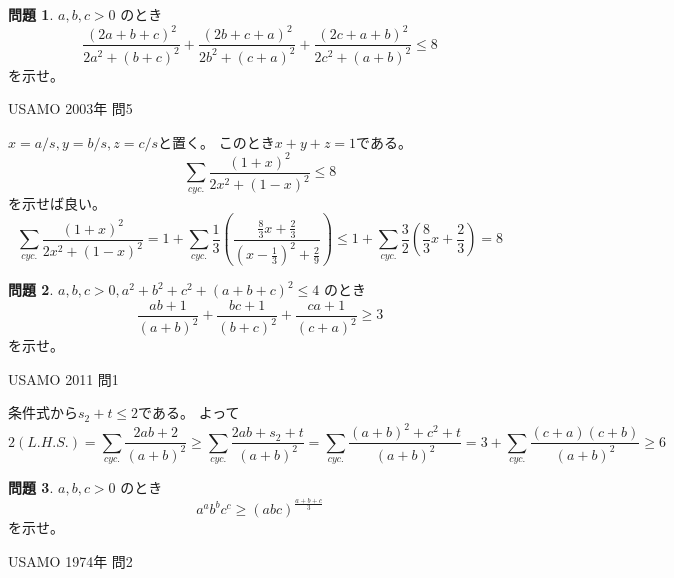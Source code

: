 \documentclass[uplatex, a5paper]{jsarticle}
\makeatletter
\theoremstyle{definition}
\newtheorem{prob}{問題}
\renewenvironment{proof}[1][\proofname]{
  \pushQED{\qed}%
  \normalfont \topsep6\p@\@plus6\p@\relax
  \trivlist
  \item[\hskip\labelsep
    #1\@addpunct{\textbf{.}}]\ignorespaces
}{%
  \popQED\endtrivlist\@endpefalse
}
\providecommand{\proofname}{証明}
\newcommand{\lhs }{ L.H.S. }
\def\qed{\hfill $\Box$}
\makeatother
\begin{document}
\newpage

\begin{prob}
  \(a,b,c>0\)
  のとき
  \[
  \frac{(2a+b+c)^2}{2a^2+(b+c)^2} + \frac{(2b+c+a)^2}{2b^2+(c+a)^2} + \frac{(2c+a+b)^2}{2c^2+(a+b)^2} \leq 8
  \]
  を示せ。
  \begin{flushright}
    USAMO 2003年 問5
  \end{flushright}
\end{prob}


\begin{proof}
  \(x=a/s , y=b/s , z=c/s\)と置く。
  このとき\(x+y+z=1\)である。
  \[
  \sum_{cyc.}\frac{(1+x)^2}{2x^2 + (1-x)^2} \leq 8
  \]
  を示せば良い。
  \[
  \sum_{cyc.}\frac{(1+x)^2}{2x^2 + (1-x)^2}
  = 1 + \sum_{cyc.}\frac{1}{3}
  \left( \frac{\frac{8}{3}x + \frac{2}{3} }{\left( x-\frac{1}{3} \right) ^2 + \frac{2}{9} } \right)
  \leq 1 + \sum_{cyc.}\frac{3}{2}\left( \frac{8}{3}x + \frac{2}{3} \right) = 8
  \]
\end{proof}










\newpage

\begin{prob}
  \(a , b , c > 0 , a^2 + b^2 + c^2 + ( a + b + c ) ^2 \leq 4\)
  のとき
  \[
  \frac{ab+1}{(a+b)^2} + \frac{bc+1}{(b+c)^2} + \frac{ca+1}{(c+a)^2} \geq 3
  \]
  を示せ。
  \begin{flushright}
    USAMO 2011 問1
  \end{flushright}
\end{prob}


\begin{proof}
  条件式から\(s_2 + t \leq 2\)である。
  よって
  \[
  2( \lhs ) = \sum_{cyc.} \frac{2ab+2}{(a+b)^2}
  \geq \sum_{cyc.}\frac{2ab + s_2 + t }{(a+b)^2}
  = \sum_{cyc.}\frac{(a+b)^2 + c^2 + t }{(a+b)^2}
  = 3 + \sum_{cyc.}\frac{(c+a)(c+b)}{(a+b)^2} \geq 6
  \]
\end{proof}










\newpage

\begin{prob}
  \(a,b,c>0\)
  のとき
  \[
  a^a b^b c^c \geq (abc)^{\frac{a+b+c}{3}}
  \]
  を示せ。
  \begin{flushright}
    USAMO 1974年 問2
  \end{flushright}
\end{prob}
\end{document}

